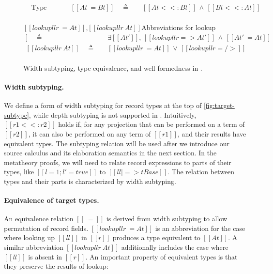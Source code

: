 \begin{figure}[t!]
  \small

  \begin{align*}
    &\text{Type equivalence} &[[At ~= Bt]] \quad\triangleq\quad& [[At <<: Bt]] \,\land\, [[Bt <<: At]] \\
  \end{align*}

  \ottdefnsRTSubtyping

  \begin{rulesection*}{$[[ lookup ll r ~= At ]]$,$[[ lookup ll r ~ At ]]$}{Abbreviations for lookup}
  \begin{align*}
    [[ lookup ll r ~= At]] \quad\triangleq\quad& \exists [[At']],\, [[lookup ll r => At']] \,\land\, [[At' ~= At]] \\
    [[ lookup ll r ~ At]]  \quad\triangleq\quad& [[lookup ll r ~= At]] \,\lor\, [[lookup ll r =/>]] \\
  \end{align*}
  \end{rulesection*}
  \ottdefnsWellformedCtx
  \ottdefnsWellformedTypes

  \caption{Width subtyping, type equivalence, and well-formedness in \lambdar.}
  \label{fig:target-subtype}
\end{figure}

\paragraph{Width subtyping.}
We define a form of width subtyping for record types at the top of
\autoref{fig:target-subtype}, while depth subtyping is not supported in
\lambdar. Intuitively, $[[ r1 <<: r2 ]]$ holds if, for any projection that can
be performed on a term of $[[r2]]$, it can also be performed on any term of
$[[r1]]$, and their results have equivalent types. The subtyping relation will
be used after we introduce our source calculus and its elaboration semantics in
the next section. In the metatheory proofs, we will need to relate record
expressions to parts of their types, like $[[{l=1 ; l'=true}]]$ to
$[[{ll|=>tBase}]]$. The relation between types and their parts is characterized
by width subtyping.

\paragraph{Equivalence of target types.}
An equivalence relation $[[~=]]$ is derived from width subtyping to allow
permutation of record fields. $[[ lookup ll r ~= At]]$ is an abbreviation for
the case where looking up $[[ll]]$ in $[[r]]$ produces a type equivalent to
$[[At]]$. A similar abbreviation $[[ lookup ll r ~ At]]$ additionally includes
the case where $[[ll]]$ is absent in $[[r]]$. An important property of
equivalent types is that they preserve the results of lookup:

